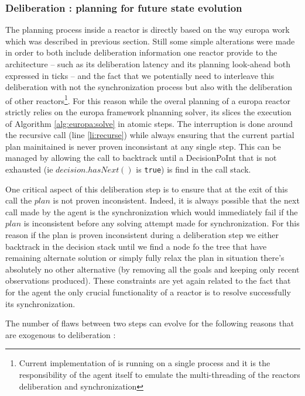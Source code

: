 \subsubsection{Deliberation : planning for future state evolution}
\label{sec:arch:plan}

The planning process inside a reactor is directly based on the way
europa work which was described in previous section. Still some simple
alterations were made in order to both include deliberation
information one reactor provide to the architecture -- such as its
deliberation latency and its planning look-ahead both expressed in
ticks -- and the fact that we potentially need to interleave this
deliberation with not the synchronization process but also with the
deliberation of other reactors\footnote{Current implementation of \rx
  is running on a single process and it is the responsibility of the
  agent itself to emulate the multi-threading of the reactors
  deliberation and synchronization}. For this reason while the overal
planning of a europa reactor strictly relies on the europa framework
plnanning solver, its slices the execution of Algorithm
\ref{alg:europa:solve} in atomic steps. The interruption is done
around the recursive call (line \ref{li:recurse}) while always
ensuring that the current partial plan mainitained is never proven
inconsistant at any single step. This can be managed by allowing the
call to backtrack until a DecisionPoInt that is not exhausted (ie
$decision.hasNext()$ is \texttt{true}) is find in the call stack.

One critical aspect of this deliberation step is to ensure that at the
exit of this call the $plan$ is not proven inconsistent. Indeed, it is
always possible that the next call made by the agent is the
synchronization which would immediately fail if the $plan$ is
inconsistent before any solving attempt made for synchronization.  For
this reason if the plan is proven inconsistent during a deliberation
step we either backtrack in the decision stack until we find a node fo
the tree that have remaining alternate solution or simply fully relax
the plan in situation there's absolutely no other alternative (by
removing all the goals and keeping only recent observations
produced). These constraints are yet again related to the fact that
for the agent the only crucial functionality of a reactor is to
resolve successfully its synchronization.

The number of flaws between two steps can evolve for the following
reasons that are exogenous to deliberation :

